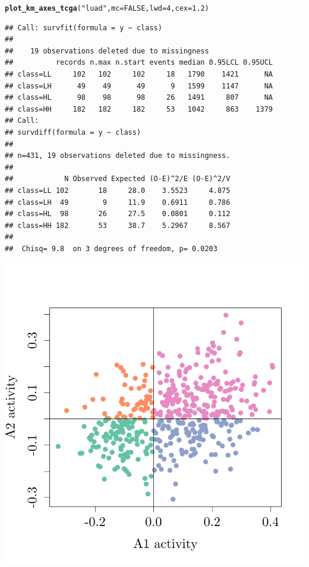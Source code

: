 \documentclass{article}\usepackage[]{graphicx}\usepackage[]{color}
\makeatletter
\def\maxwidth{ %
  \ifdim\Gin@nat@width>\linewidth
    \linewidth
  \else
    \Gin@nat@width
  \fi
}
\newcommand{\hlnum}[1]{\textcolor[rgb]{0.686,0.059,0.569}{#1}}%
\newcommand{\hlstr}[1]{\textcolor[rgb]{0.192,0.494,0.8}{#1}}%
\newcommand{\hlstd}[1]{\textcolor[rgb]{0.345,0.345,0.345}{#1}}%
\newcommand{\hlkwc}[1]{\textcolor[rgb]{0.333,0.667,0.333}{#1}}%
\newcommand{\hlkwd}[1]{\textcolor[rgb]{0.737,0.353,0.396}{\textbf{#1}}}%
\newenvironment{kframe}{%
 \def\at@end@of@kframe{}%
 \ifinner\ifhmode%
  \def\at@end@of@kframe{\end{minipage}}%
  \begin{minipage}{\columnwidth}%
 \fi\fi%
 \def\FrameCommand##1{\hskip\@totalleftmargin \hskip-\fboxsep
 \colorbox{shadecolor}{##1}\hskip-\fboxsep
     \hskip-\linewidth \hskip-\@totalleftmargin \hskip\columnwidth}%
 \MakeFramed {\advance\hsize-\width
   \@totalleftmargin\z@ \linewidth\hsize
   \@setminipage}}%
 {\par\unskip\endMakeFramed%
 \at@end@of@kframe}
\newenvironment{knitrout}{}{} %
\makeatother
\begin{document}
\begin{knitrout}
{}


\begin{kframe}\begin{alltt}
\hlkwd{plot_km_axes_tcga}\hlstd{(}\hlstr{"luad"}\hlstd{,} \hlkwc{mc} \hlstd{=} \hlnum{FALSE}\hlstd{,} \hlkwc{lwd} \hlstd{=} \hlnum{4}\hlstd{,} \hlkwc{cex} \hlstd{=} \hlnum{1.2}\hlstd{)}
\end{alltt}


{\ttfamily\noindent{}}\begin{verbatim}
## Call: survfit(formula = y ~ class)
## 
##    19 observations deleted due to missingness 
##          records n.max n.start events median 0.95LCL 0.95UCL
## class=LL     102   102     102     18   1790    1421      NA
## class=LH      49    49      49      9   1599    1147      NA
## class=HL      98    98      98     26   1491     807      NA
## class=HH     182   182     182     53   1042     863    1379
## Call:
## survdiff(formula = y ~ class)
## 
## n=431, 19 observations deleted due to missingness.
## 
##            N Observed Expected (O-E)^2/E (O-E)^2/V
## class=LL 102       18     28.0    3.5523     4.875
## class=LH  49        9     11.9    0.6911     0.786
## class=HL  98       26     27.5    0.0801     0.112
## class=HH 182       53     38.7    5.2967     8.567
## 
##  Chisq= 9.8  on 3 degrees of freedom, p= 0.0203
\end{verbatim}
\end{kframe}

{\centering \includegraphics[width=\maxwidth]{figure/km-curves-13} 

}
\end{knitrout}
\end{document}
